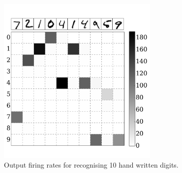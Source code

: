 		\begin{figure}[tbp!]
			\centering
			\includegraphics[width=0.7\textwidth]{pics_iconip/7.pdf}
			\caption{Output firing rates for recognising 10 hand written digits.}
			\label{Fig:out}
		\end{figure}
	
